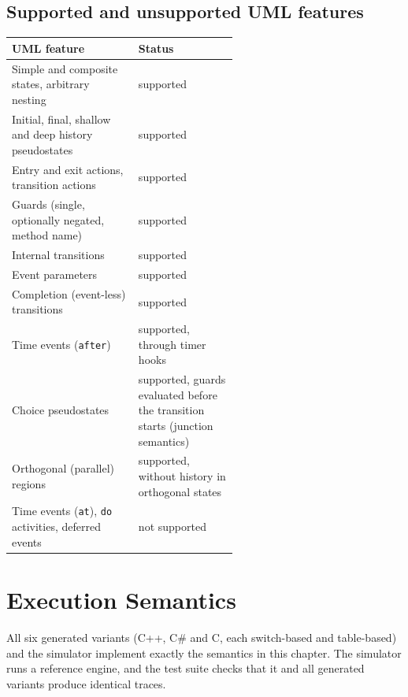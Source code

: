 \documentclass[11pt,a4paper,openany]{report}
\newcommand{\code}[1]{\texttt{#1}}
\begin{document}
\section{Supported and unsupported UML features}
\begin{center}
\renewcommand{\arraystretch}{1.15}
\begin{tabularx}{\linewidth}{@{}>{\raggedright\arraybackslash}p{0.57\linewidth}>{\raggedright\arraybackslash}X@{}}
\toprule
\textbf{UML feature} & \textbf{Status} \\
\midrule
Simple and composite states, arbitrary nesting & supported \\
Initial, final, shallow and deep history pseudostates & supported \\
Entry and exit actions, transition actions & supported \\
Guards (single, optionally negated, method name) & supported \\
Internal transitions & supported \\
Event parameters & supported \\
Completion (event-less) transitions & supported \\
Time events (\code{after}) & supported, through timer hooks \\
Choice pseudostates & supported, guards evaluated before the transition starts (junction semantics) \\
Orthogonal (parallel) regions & supported, without history in orthogonal states \\
Time events (\code{at}), \code{do} activities, deferred events & not supported \\
\bottomrule
\end{tabularx}
\end{center}

\chapter{Execution Semantics}
\label{ch:semantics}

All six generated variants (C++, C\# and C, each switch-based and table-based) and the simulator
implement exactly the semantics in this chapter. The simulator runs a reference engine, and the test
suite checks that it and all generated variants produce identical traces.
\end{document}

